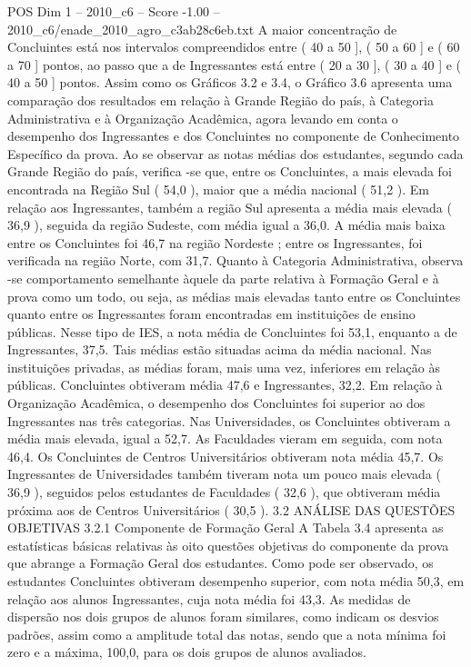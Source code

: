 \begin{textsample}{POS Dim 1 – 2010\_c6 – Score -1.00 – 2010\_c6/enade\_2010\_agro\_c3ab28c6eb.txt}
A maior concentração de Concluintes está nos intervalos compreendidos entre ( 40 a 50 ], ( 50 a 60 ] e ( 60 a 70 ] pontos, ao passo que a de Ingressantes está entre ( 20 a 30 ], ( 30 a 40 ] e ( 40 a 50 ] pontos.
Assim como os Gráficos 3.2 e 3.4, o Gráfico 3.6 apresenta uma comparação dos resultados em relação à Grande Região do país, à Categoria Administrativa e à Organização Acadêmica, agora levando em conta o desempenho dos Ingressantes e dos Concluintes no componente de Conhecimento Específico da prova.
Ao se observar as notas médias dos estudantes, segundo cada Grande Região do país, verifica -se que, entre os Concluintes, a mais elevada foi encontrada na Região Sul ( 54,0 ), maior que a média nacional ( 51,2 ).
Em relação aos Ingressantes, também a região Sul apresenta a média mais elevada ( 36,9 ), seguida da região Sudeste, com média igual a 36,0.
A média mais baixa entre os Concluintes foi 46,7 na região Nordeste ; entre os Ingressantes, foi verificada na região Norte, com 31,7.
Quanto à Categoria Administrativa, observa -se comportamento semelhante àquele da parte relativa à Formação Geral e à prova como um todo, ou seja, as médias mais elevadas tanto entre os Concluintes quanto entre os Ingressantes foram encontradas em instituições de ensino públicas.
Nesse tipo de IES, a nota média de Concluintes foi 53,1, enquanto a de Ingressantes, 37,5.
Tais médias estão situadas acima da média nacional.
Nas instituições privadas, as médias foram, mais uma vez, inferiores em relação às públicas.
Concluintes obtiveram média 47,6 e Ingressantes, 32,2.
Em relação à Organização Acadêmica, o desempenho dos Concluintes foi superior ao dos Ingressantes nas três categorias.
Nas Universidades, os Concluintes obtiveram a média mais elevada, igual a 52,7.
As Faculdades vieram em seguida, com nota 46,4.
Os Concluintes de Centros Universitários obtiveram nota média 45,7.
Os Ingressantes de Universidades também tiveram nota um pouco mais elevada ( 36,9 ), seguidos pelos estudantes de Faculdades ( 32,6 ), que obtiveram média próxima aos de Centros Universitários ( 30,5 ). 3.2 ANÁLISE DAS QUESTÕES OBJETIVAS 3.2.1 Componente de Formação Geral A Tabela 3.4 apresenta as estatísticas básicas relativas às oito questões objetivas do componente da prova que abrange a Formação Geral dos estudantes.
Como pode ser observado, os estudantes Concluintes obtiveram desempenho superior, com nota média 50,3, em relação aos alunos Ingressantes, cuja nota média foi 43,3.
As medidas de dispersão nos dois grupos de alunos foram similares, como indicam os desvios padrões, assim como a amplitude total das notas, sendo que a nota mínima foi zero e a máxima, 100,0, para os dois grupos de alunos avaliados.

\end{textsample}
